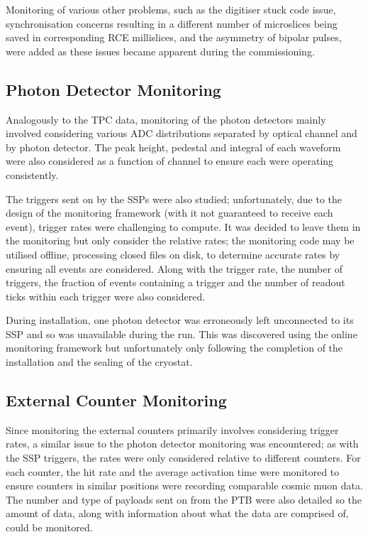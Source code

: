 Monitoring of various other problems, such as the digitiser stuck code issue, synchronisation concerns resulting in a different number of microslices being saved in corresponding RCE millislices, and the asymmetry of bipolar pulses, were added as these issues became apparent during the commissioning.

\subsection{Photon Detector Monitoring}\label{sec:PhotonMonitoring}

Analogously to the TPC data, monitoring of the photon detectors mainly involved considering various ADC distributions separated by optical channel and by photon detector.  The peak height, pedestal and integral of each waveform were also considered as a function of channel to ensure each were operating consistently.

The triggers sent on by the SSPs were also studied; unfortunately, due to the design of the monitoring framework (with it not guaranteed to receive each event), trigger rates were challenging to compute.  It was decided to leave them in the monitoring but only consider the relative rates; the monitoring code may be utilised offline, processing closed files on disk, to determine accurate rates by ensuring all events are considered.  Along with the trigger rate, the number of triggers, the fraction of events containing a trigger and the number of readout ticks within each trigger were also considered.

During installation, one photon detector was erroneously left unconnected to its SSP and so was unavailable during the run.  This was discovered using the online monitoring framework but unfortunately only following the completion of the installation and the sealing of the cryostat.

\subsection{External Counter Monitoring}\label{sec:CounterMonitoring}

Since monitoring the external counters primarily involves considering trigger rates, a similar issue to the photon detector monitoring was encountered; as with the SSP triggers, the rates were only considered relative to different counters.  For each counter, the hit rate and the average activation time were monitored to ensure counters in similar positions were recording comparable cosmic muon data.  The number and type of payloads sent on from the PTB were also detailed so the amount of data, along with information about what the data are comprised of, could be monitored.

